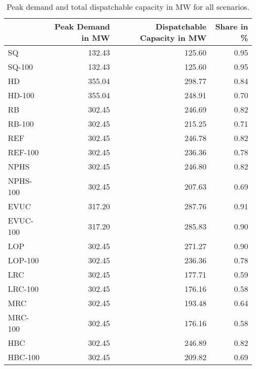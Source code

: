 \begin{table}
\centering
\caption{Peak demand and total dispatchable capacity in MW for all scenarios.}
\label{tab:energy}
\begin{tabular}{lrrr}
\toprule
{} &  Peak Demand in MW &  Dispatchable Capacity in MW &  Share in \% \\
\midrule
SQ       &             132.43 &                       125.60 &        0.95 \\
SQ-100   &             132.43 &                       125.60 &        0.95 \\
HD       &             355.04 &                       298.77 &        0.84 \\
HD-100   &             355.04 &                       248.91 &        0.70 \\
RB       &             302.45 &                       246.69 &        0.82 \\
RB-100   &             302.45 &                       215.25 &        0.71 \\
REF      &             302.45 &                       246.78 &        0.82 \\
REF-100  &             302.45 &                       236.36 &        0.78 \\
NPHS     &             302.45 &                       246.80 &        0.82 \\
NPHS-100 &             302.45 &                       207.63 &        0.69 \\
EVUC     &             317.20 &                       287.76 &        0.91 \\
EVUC-100 &             317.20 &                       285.83 &        0.90 \\
LOP      &             302.45 &                       271.27 &        0.90 \\
LOP-100  &             302.45 &                       236.36 &        0.78 \\
LRC      &             302.45 &                       177.71 &        0.59 \\
LRC-100  &             302.45 &                       176.16 &        0.58 \\
MRC      &             302.45 &                       193.48 &        0.64 \\
MRC-100  &             302.45 &                       176.16 &        0.58 \\
HBC      &             302.45 &                       246.89 &        0.82 \\
HBC-100  &             302.45 &                       209.82 &        0.69 \\
\bottomrule
\end{tabular}
\end{table}
